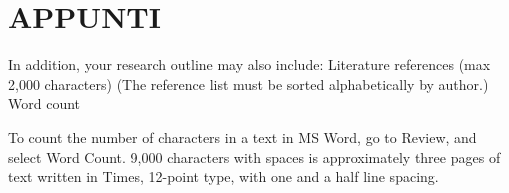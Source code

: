 \documentclass[
	12pt,
	a4paper,
	twocolumn
	]{article}
\begin{document}
\section{APPUNTI}
In addition, your research outline may also include:
Literature references (max 2,000 characters)
(The reference list must be sorted alphabetically by author.)
Word count

To count the number of characters in a text in MS Word, go to Review, and select Word Count. 9,000 characters with spaces is approximately three pages of text written in Times, 12-point type, with one and a half line spacing.


\end{document}
